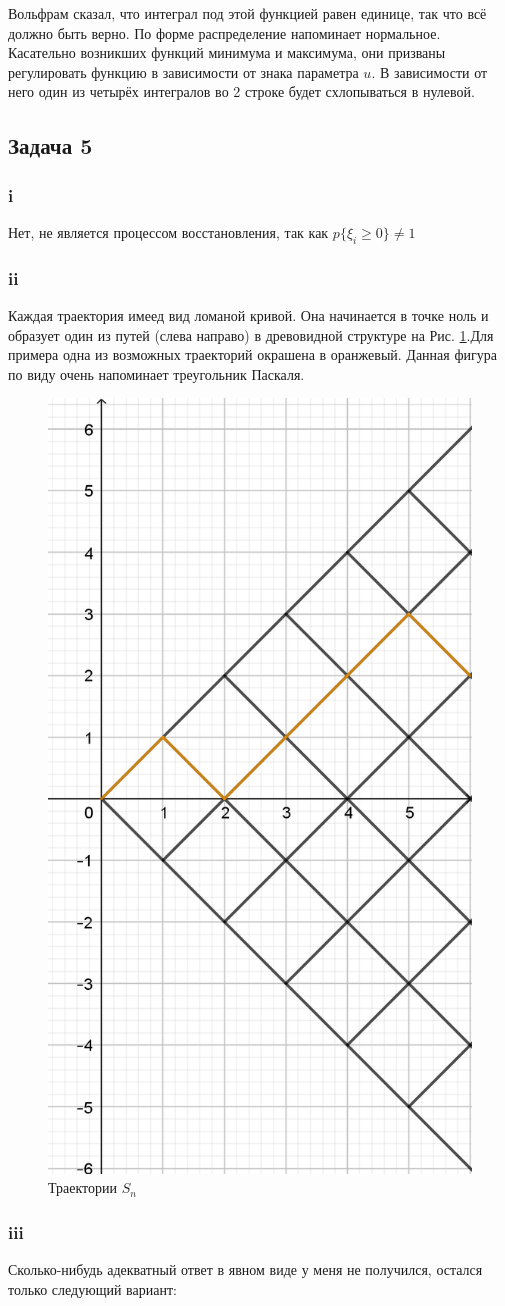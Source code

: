 \documentclass[a4paper,12pt]{article}
\begin{document}
Вольфрам сказал, что интеграл под этой функцией равен единице, так что всё должно быть верно. По форме распределение напоминает нормальное. Касательно возникших функций минимума и максимума, они призваны регулировать функцию в зависимости от знака параметра $ u $. В зависимости от него один из четырёх интегралов во 2 строке будет схлопываться в нулевой.

\subsection{Задача 5}

\subsubsection{i}

Нет, не является процессом восстановления, так как $ p\{ \xi_i \ge 0 \} \neq 1 $

\subsubsection{ii}
Каждая траектория имеед вид ломаной кривой. Она начинается в точке ноль и образует один из путей (слева направо) в древовидной структуре на Рис.  \ref{rombs}.Для примера одна из возможных траекторий окрашена в оранжевый. Данная фигура по виду очень напоминает треугольник Паскаля.


\begin{figure}[h]
	\includegraphics[width=0.3\linewidth]{14}
	\caption{Траектории $ S_n $}
	\label{rombs}
\end{figure}
\subsubsection{iii}

Сколько-нибудь адекватный ответ в явном виде у меня не получился, остался только следующий вариант:
\end{document}

